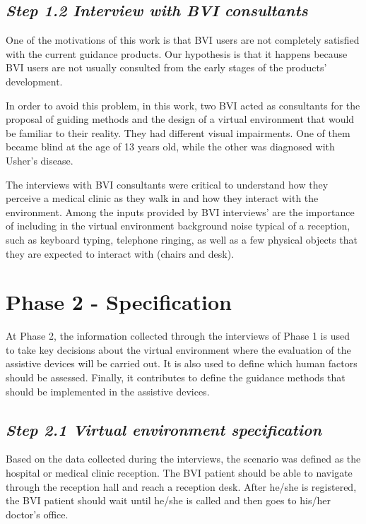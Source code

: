     \subsection*{\textit{Step 1.2 Interview with BVI consultants}}
    
        One of the motivations of this work is that BVI users are not completely satisfied with the current guidance products. Our hypothesis is that it happens because BVI users are not usually consulted from the early stages of the products’ development.

        In order to avoid this problem, in this work, two BVI acted as consultants for the proposal of guiding methods and the design of a virtual environment that would be familiar to their reality. They had different visual impairments. One of them became blind at the age of 13 years old, while the other was diagnosed with Usher’s disease. 

        The interviews with BVI consultants were critical to understand how they perceive a medical clinic as they walk in and how they interact with the environment. Among the inputs provided by BVI interviews’ are the importance of including in the virtual environment background noise typical of a reception, such as keyboard typing, telephone ringing, as well as a few physical objects that they are expected to interact with (chairs and desk).
    

\section{Phase 2 - Specification}
\label{sec:idealization_phase}
    At Phase 2, the information collected through the interviews of Phase 1 is used to take key decisions about the virtual environment where the evaluation of the assistive devices will be carried out. It is also used to define which human factors should be assessed. Finally, it contributes to define the guidance methods that should be implemented in the assistive devices.
    

    \subsection*{\textit{Step 2.1 Virtual environment specification}}
        Based on the data collected during the interviews, the scenario was defined as the hospital or medical clinic reception. The BVI patient should be able to navigate through the reception hall and reach a reception desk. After he/she is registered, the BVI patient should wait until he/she is called and then goes to his/her doctor’s office.

